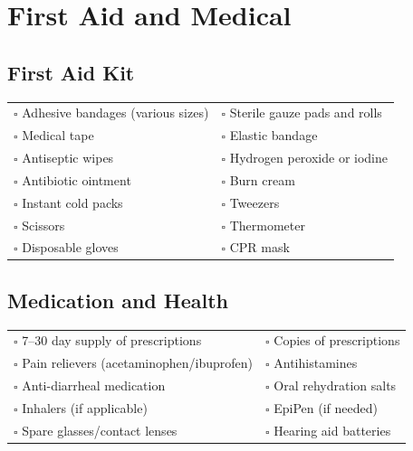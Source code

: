 
\section{First Aid and Medical}
\label{sec:medical}

\subsection{First Aid Kit}

\begin{tabular}{p{9cm} p{9cm}}
$\square$ Adhesive bandages (various sizes) & $\square$ Sterile gauze pads and rolls \\ 
$\square$ Medical tape & $\square$ Elastic bandage \\ 
$\square$ Antiseptic wipes & $\square$ Hydrogen peroxide or iodine \\ 
$\square$ Antibiotic ointment & $\square$ Burn cream \\ 
$\square$ Instant cold packs & $\square$ Tweezers \\ 
$\square$ Scissors & $\square$ Thermometer \\ 
$\square$ Disposable gloves & $\square$ CPR mask \\ 
\end{tabular}

\subsection{Medication and Health}

\begin{tabular}{p{9cm} p{9cm}}
$\square$ 7–30 day supply of prescriptions & $\square$ Copies of prescriptions \\ 
$\square$ Pain relievers (acetaminophen/ibuprofen) & $\square$ Antihistamines \\ 
$\square$ Anti-diarrheal medication & $\square$ Oral rehydration salts \\ 
$\square$ Inhalers (if applicable) & $\square$ EpiPen (if needed) \\ 
$\square$ Spare glasses/contact lenses & $\square$ Hearing aid batteries \\ 
\end{tabular}

